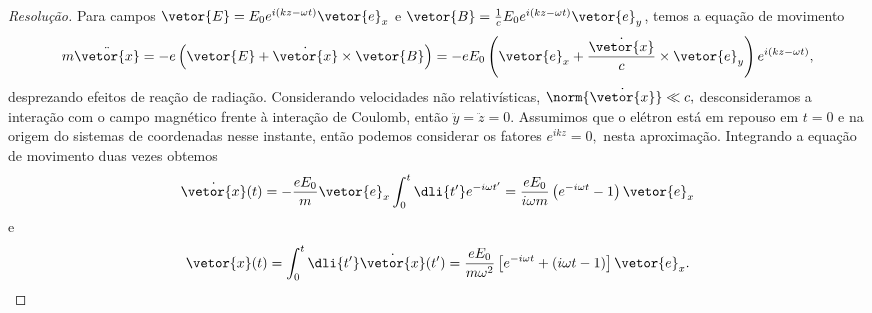 \begin{proof}[Resolução]
   Para campos \(\vetor{E} = E_0 e^{i(kz - \omega t)}\vetor{e}_x\) e \(\vetor{B} = \frac{1}{c}E_0 e^{i(kz - \omega t)}\vetor{e}_y\), temos a equação de movimento
   \begin{equation*}
      m \ddot{\vetor{x}} = -e\left(\vetor{E} + \dot{\vetor{x}}\times \vetor{B}\right) = -e E_0\left(\vetor{e}_x + \frac{\dot{\vetor{x}}}{c} \times \vetor{e}_y\right)e^{i(kz - \omega t)},
   \end{equation*}
   desprezando efeitos de reação de radiação. Considerando velocidades não relativísticas, \(\norm{\dot{\vetor{x}}} \ll c,\) desconsideramos a interação com o campo magnético frente à interação de Coulomb, então \(\ddot{y} = \ddot{z} = 0.\) Assumimos que o elétron está em repouso em \(t = 0\) e na origem do sistemas de coordenadas nesse instante, então podemos considerar os fatores \(e^{ikz} = 0,\) nesta aproximação. Integrando a equação de movimento duas vezes obtemos
   \begin{equation*}
      \dot{\vetor{x}}(t) = -\frac{e E_0}{m}\vetor{e}_x \int_0^t \dli{t'} e^{-i \omega t'} = \frac{e E_0}{i \omega m} \left(e^{-i \omega t} - 1\right)\vetor{e}_x
   \end{equation*}
   e
   \begin{equation*}
      \vetor{x}(t) = \int_0^t \dli{t'} \dot{\vetor{x}}(t') =  \frac{e E_0}{m \omega^2}\left[e^{-i\omega t} +  \left(i \omega t - 1\right)\right]\vetor{e}_x.
   \end{equation*}


\end{proof}
